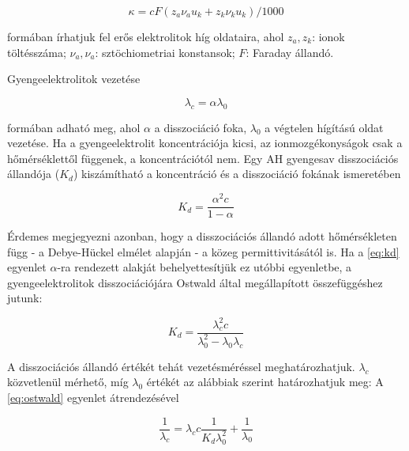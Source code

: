 \begin{equation}
\label{eq:kohlrausch2}
	\kappa
	=
	c
	F
	(z_a \nu _a u_k + z_k \nu _k u_k)
	/1000
\end{equation}

formában írhatjuk fel erős elektrolitok híg oldataira, ahol $z_a, z_k$: ionok töltésszáma; $\nu _a, \nu _a$: sztöchiometriai konstansok; $F$: Faraday állandó.

Gyengeelektrolitok vezetése

\begin{equation}
\label{eq:lambdam}
        \lambda_c
        =
        \alpha
	\lambda_0
\end{equation}

formában adható meg, ahol $\alpha$ a disszociáció foka, $\lambda _0$ a végtelen hígítású oldat vezetése.
Ha a gyengeelektrolit koncentrációja kicsi, az ionmozgékonyságok csak a hőmérséklettől függenek, a koncentrációtól nem.
Egy AH gyengesav disszociációs állandója ($K_d$) kiszámítható a koncentráció és a disszociáció fokának ismeretében

\begin{equation}
\label{eq:kd}
        K_d
        =
        \frac{\alpha^2 c}{1-\alpha}
\end{equation}

Érdemes megjegyezni azonban, hogy a disszociációs állandó adott hőmérsékleten függ - a Debye-Hückel elmélet alapján - a közeg permittivitásától is.
Ha a \ref{eq:kd} egyenlet $\alpha$-ra rendezett alakját behelyettesítjük ez utóbbi egyenletbe, a gyengeelektrolitok disszociációjára Ostwald által megállapított összefüggéshez jutunk:

\begin{equation}
\label{eq:ostwald}
        K_d
        =
        \frac{\lambda_c^2 c}{\lambda_0^2 - \lambda_0\lambda_c}
\end{equation}

A disszociációs állandó értékét tehát vezetésméréssel meghatározhatjuk. 
$\lambda_c$ közvetlenül mérhető, míg $\lambda_0$ értékét az alábbiak szerint határozhatjuk meg:
A \ref{eq:ostwald} egyenlet átrendezésével

\begin{equation}
\label{eq:ostwald2}
        \frac{1}{\lambda_c}
        =
	\lambda_c
	c
	\frac{1}{K_d \lambda_0^2}
	+\frac{1}{\lambda_0}
\end{equation}

